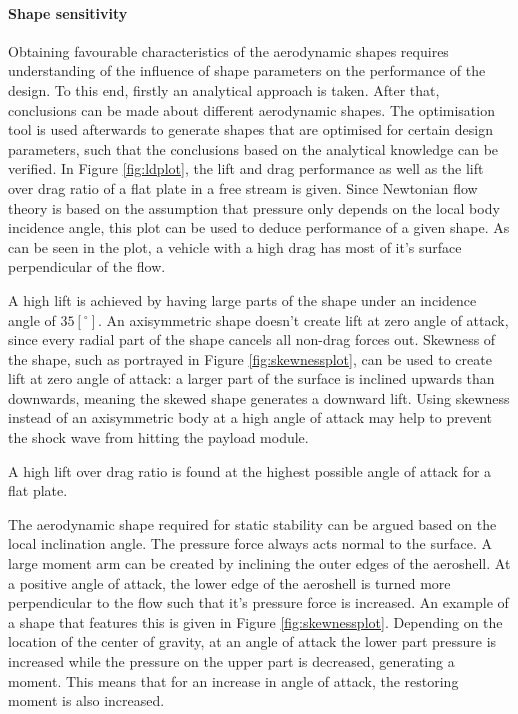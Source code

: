 \paragraph{Shape sensitivity} \label{sec:aerooptima}
Obtaining favourable characteristics of the aerodynamic shapes requires understanding of the influence of shape parameters on the performance of the design. To this end, firstly an analytical approach is taken. After that, conclusions can be made about different aerodynamic shapes. The optimisation tool is used afterwards to generate shapes that are optimised for certain design parameters, such that the conclusions based on the analytical knowledge can be verified.
In Figure \ref{fig:ldplot}, the lift and drag performance as well as the lift over drag ratio of a flat plate in a free stream is given. Since Newtonian flow theory is based on the assumption that pressure only depends on the local body incidence angle, this plot can be used to deduce performance of a given shape. As can be seen in the plot, a vehicle with a high drag has most of it's surface perpendicular of the flow.

A high lift is achieved by having large parts of the shape under an incidence angle of $35 [^\circ]$. An axisymmetric shape doesn't create lift at zero angle of attack, since every radial part of the shape cancels all non-drag forces out. Skewness of the shape, such as portrayed in Figure \ref{fig:skewnessplot}, can be used to create lift at zero angle of attack: a larger part of the surface is inclined upwards than downwards, meaning the skewed shape generates a downward lift. Using skewness instead of an axisymmetric body at a high angle of attack may help to prevent the shock wave from hitting the payload module.

A high lift over drag ratio is found at the highest possible angle of attack for a flat plate.

The aerodynamic shape required for static stability can be argued based on the local inclination angle. The pressure force always acts normal to the surface. A large moment arm can be created by inclining the outer edges of the aeroshell. At a positive angle of attack, the lower edge of the aeroshell is turned more perpendicular to the flow such that it's pressure force is increased. An example of a shape that features this is given in Figure \ref{fig:skewnessplot}. Depending on the location of the center of gravity, at an angle of attack the lower part pressure is increased while the pressure on the upper part is decreased, generating a moment. This means that for an increase in angle of attack, the restoring moment is also increased.

